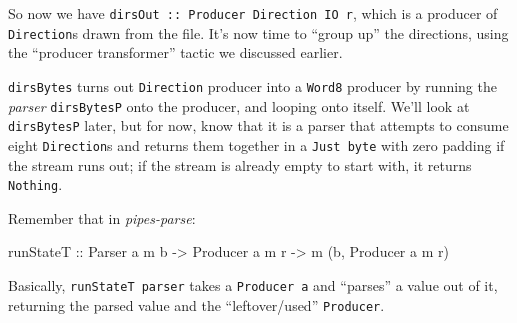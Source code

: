 \documentclass[]{article}
\newenvironment{Shaded}{\begin{snugshade}}{\end{snugshade}}
\newcommand{\CommentTok}[1]{\textcolor[rgb]{0.56,0.35,0.01}{\textit{#1}}}
\newcommand{\DataTypeTok}[1]{\textcolor[rgb]{0.13,0.29,0.53}{#1}}
\newcommand{\FunctionTok}[1]{\textcolor[rgb]{0.00,0.00,0.00}{#1}}
\newcommand{\KeywordTok}[1]{\textcolor[rgb]{0.13,0.29,0.53}{\textbf{#1}}}
\newcommand{\NormalTok}[1]{#1}
\newcommand{\OtherTok}[1]{\textcolor[rgb]{0.56,0.35,0.01}{#1}}
\begin{document}
So now we have \texttt{dirsOut\ ::\ Producer\ Direction\ IO\ r}, which is a
producer of \texttt{Direction}s drawn from the file. It's now time to ``group
up'' the directions, using the ``producer transformer'' tactic we discussed
earlier.

\begin{Shaded}
\end{Shaded}

\texttt{dirsBytes} turns out \texttt{Direction} producer into a \texttt{Word8}
producer by running the \emph{parser} \texttt{dirsBytesP} onto the producer, and
looping onto itself. We'll look at \texttt{dirsBytesP} later, but for now, know
that it is a parser that attempts to consume eight \texttt{Direction}s and
returns them together in a \texttt{Just\ byte} with zero padding if the stream
runs out; if the stream is already empty to start with, it returns
\texttt{Nothing}.

Remember that in \emph{pipes-parse}:

\begin{Shaded}
\begin{Highlighting}[]
\OtherTok{runStateT ::} \DataTypeTok{Parser}\NormalTok{ a m b }\OtherTok{->} \DataTypeTok{Producer}\NormalTok{ a m r }\OtherTok{->}\NormalTok{ m (b, }\DataTypeTok{Producer}\NormalTok{ a m r)}
\end{Highlighting}
\end{Shaded}

Basically, \texttt{runStateT\ parser} takes a \texttt{Producer\ a} and
``parses'' a value out of it, returning the parsed value and the
``leftover/used'' \texttt{Producer}.
\end{document}
